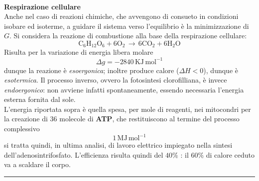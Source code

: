 \documentclass[10pt, oneside]{book}
\newcommand{\infobox}[2]{\vspace{0.5cm}~\\ \textbf{#1} \hrulefill \vspace{0.2cm}\\#2 {}\,\\\hrule \vspace{0.5cm}}
\begin{document}
\infobox{Respirazione cellulare}{Anche nel caso di reazioni chimiche, che avvengono di consueto in condizioni isobare ed isoterme, a guidare il sistema verso l'equilibrio è la minimizzazione di $G$. Si considera la reazione di combustione alla base della respirazione cellulare:
\[\mathrm{C_6H_{12}O_6 + 6O_2 \, \rightarrow \, 6 CO_2 + 6 H_2O}\]
Risulta per la variazione di energia libera molare
\[\Delta g = - 2840 \,\mathrm{KJ \, mol^{-1}}\]
dunque la reazione è \textit{esoergonica}; inoltre produce calore ($\Delta H < 0$), dunque è \textit{esotermica}. Il processo inverso, ovvero la fotosintesi clorofilliana, è invece \textit{endoergonico}: non avviene infatti spontaneamente, essendo necessaria l'energia esterna fornita dal sole.\\
L'energia riportata sopra è quella spesa, per mole di reagenti, nei mitocondri per la creazione di 36 molecole di \textbf{ATP}, che restituiscono al termine del processo complessivo
\[1 \, \mathrm{MJ \, mol^{-1}}\]
si tratta quindi, in ultima analisi, di lavoro elettrico impiegato nella sintesi dell'adenosintrifosfato. L'efficienza risulta quindi del $40\%$ : il $60\%$ di calore ceduto va a scaldare il corpo.
}
\end{document}
